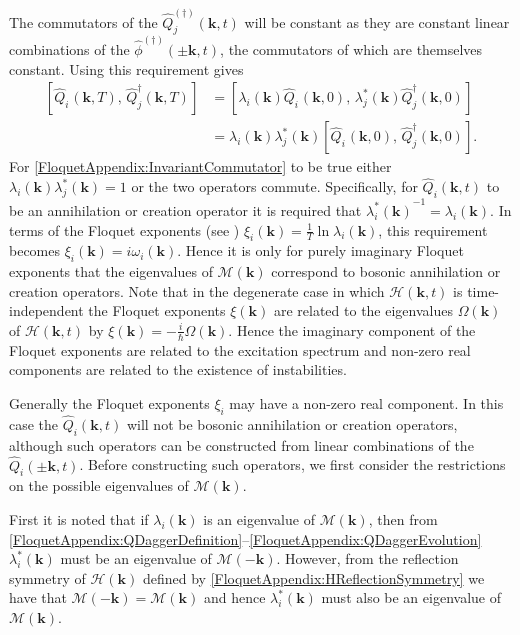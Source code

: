 The commutators of the $\hat{Q}_j^{(\dagger)}(\bm{k}, t)$ will be constant as they are constant linear combinations of the $\hat{\phi}^{(\dagger)}(\pm\bm{k}, t)$, the commutators of which are themselves constant. Using this requirement gives
\begin{align}
    \left[ \hat{Q}_i^{\phantom{\dagger}}(\bm{k}, T),\, \hat{Q}_j^\dagger(\bm{k}, T) \right] &= \left[ \lambda_i(\bm{k}) \hat{Q}_i^{\phantom{\dagger}}(\bm{k}, 0),\, \lambda_j^*(\bm{k}) \hat{Q}_j^\dagger(\bm{k}, 0)\right]\\
        &= \lambda_i(\bm{k}) \lambda_j^*(\bm{k}) \left[ \hat{Q}_i^{\phantom{\dagger}}(\bm{k}, 0),\, \hat{Q}_j^\dagger(\bm{k}, 0)\right].
        \label{FloquetAppendix:InvariantCommutator}
\end{align}
For \eqref{FloquetAppendix:InvariantCommutator} to be true either $\lambda_i(\bm{k}) \lambda_j^*(\bm{k}) = 1$ or the two operators commute. Specifically, for $\hat{Q}_i(\bm{k}, t)$ to be an annihilation or creation operator it is required that ${\lambda_i^*(\bm{k})}^{-1} = \lambda_i(\bm{k})$. In terms of the Floquet exponents (see ) $\displaystyle \xi_i(\bm{k}) = \frac{1}{T} \ln \lambda_i(\bm{k})$, this requirement becomes $\xi_i(\bm{k}) = i \omega_i(\bm{k})$. Hence it is only for purely imaginary Floquet exponents that the eigenvalues of $\mathcal{M}(\bm{k})$ correspond to bosonic annihilation or creation operators. Note that in the degenerate case in which $\mathcal{H}(\bm{k}, t)$ is time-independent the Floquet exponents $\xi(\bm{k})$ are related to the eigenvalues $\Omega(\bm{k})$ of $\mathcal{H}(\bm{k}, t)$ by $\displaystyle \xi(\bm{k}) = -\frac{i}{\hbar} \Omega(\bm{k})$. Hence the imaginary component of the Floquet exponents are related to the excitation spectrum and non-zero real components are related to the existence of instabilities.

Generally the Floquet exponents $\xi_i$ may have a non-zero real component. In this case the $\hat{Q}_i(\bm{k}, t)$ will not be bosonic annihilation or creation operators, although such operators can be constructed from linear combinations of the $\hat{Q}_i(\pm\bm{k}, t)$. Before constructing such operators, we first consider the restrictions on the possible eigenvalues of $\mathcal{M}(\bm{k})$.

First it is noted that if $\lambda_i(\bm{k})$ is an eigenvalue of $\mathcal{M}(\bm{k})$, then from \eqref{FloquetAppendix:QDaggerDefinition}--\eqref{FloquetAppendix:QDaggerEvolution} $\lambda_i^*(\bm{k})$ must be an eigenvalue of $\mathcal{M}(-\bm{k})$. However, from the reflection symmetry of $\mathcal{H}(\bm{k})$ defined by \eqref{FloquetAppendix:HReflectionSymmetry} we have that $\mathcal{M}(-\bm{k}) = \mathcal{M}(\bm{k})$ and hence $\lambda_i^*(\bm{k})$ must also be an eigenvalue of $\mathcal{M}(\bm{k})$.

